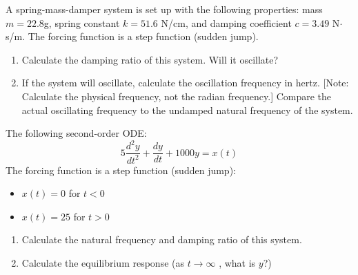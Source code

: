 \documentclass[a4paper,11pt,dvipsnames]{book}
\begin{document}
\begin{question}

A spring-mass-damper system is set up with the following
properties: mass $m = 22.8$g, spring constant $k = 51.6$ N/cm, and damping coefficient $c = 3.49 $ N$\cdot$s/m. The forcing function is a step function (sudden jump).
\begin{enumerate}
\item Calculate the damping ratio of this system. Will it oscillate?
\item If the system will oscillate, calculate the oscillation frequency in hertz. [Note: Calculate the physical frequency, not the radian frequency.] Compare the actual oscillating frequency to the undamped natural frequency of the system.
\end{enumerate}
\examspace*{10em}

\end{question}
\begin{solution}


\end{solution}

\begin{question}

The following second-order ODE:
\begin{equation*}
5\frac{d^2y}{dt^2} + \frac{dy}{dt} + 1000y= x(t)
\end{equation*}
The forcing function is a step function (sudden jump):
\begin{itemize}
\item $x(t) = 0$ for $t<0$
\item $x(t) = 25$ for $t>0$
\end{itemize}


\begin{enumerate}
\item Calculate the natural frequency and damping ratio of this system.
\item Calculate the equilibrium response (as $t \to \infty$ , what is $y$?)
\end{enumerate}

\examspace*{10em}

\end{question}
\begin{solution}


\end{solution}
\end{document}
